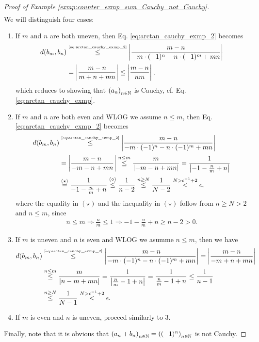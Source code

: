 \begin{proof}[Proof of Example \ref{exmp:counter_exmp_sum_Cauchy_not_Cauchy}]
\begin{align}
	\end{align}
	We will distinguish four cases:
	\begin{enumerate}
		\item If $m$ and $n$ are both uneven, then Eq. \eqref{eq:arctan_cauchy_exmp_2} becomes 
		\begin{align*}
			d(b_m, b_n) &\overset{\tiny\eqref{eq:arctan_cauchy_exmp_2}}{\leq} \abs{\frac{m - n}{- m \cdot (-1)^n -n\cdot (-1)^m + mn}}
			\\[2pt] &= \abs{\frac{m - n}{m + n + mn}} \leq \abs{\frac{m - n}{nm}},
		\end{align*}
		which reduces to showing that $\seq[a_n]$ is Cauchy, cf. Eq. \eqref{eq:arctan_cauchy_exmp}.
		
		\item If $m$ and $n$ are both even and WLOG we assume $n\leq m$, then Eq. \eqref{eq:arctan_cauchy_exmp_2} becomes
		\begin{align*}
			d(b_m, b_n) &\overset{\tiny\eqref{eq:arctan_cauchy_exmp_2}}{\leq} \abs{\frac{m - n}{- m \cdot (-1)^n -n\cdot (-1)^m + mn}}
			\\[2pt] &= \abs{\frac{m - n}{-m-n+mn}} \overset{n\leq m}{\leq} \frac{m}{\abs{-m -n + mn}} = \frac{1}{\abs{-1 -\frac{n}{m} + n}}
			\\[2pt] &\overset{(\star)}{=} \frac{1}{-1-\frac{n}{m} + n} \overset{(\diamond)}{\leq}\frac{1}{n - 2} \overset{n\geq N}{\leq} \frac{1}{N - 2} \overset{N > \epsilon^{-1} + 2}{<} \epsilon,
		\end{align*} 
		where the equality in $(\star)$ and the inequality in $(\star)$ follow from $n\geq N > 2$ and $n\leq m$, since 
		\begin{align*}
			n \leq m \Rightarrow \frac{n}{m} \leq 1\Rightarrow -1- \frac{n}{m} + n\geq n - 2 > 0.
		\end{align*}
		
		\item If $m$ is uneven and $n$ is even and WLOG we asumme $n\leq m$, then we have
		\begin{align*}
			d(b_m, b_n) &\overset{\tiny\eqref{eq:arctan_cauchy_exmp_2}}{\leq} \abs{\frac{m - n}{- m \cdot (-1)^n -n\cdot (-1)^m + mn}} = \abs{\frac{m - n}{-m + n + mn}}
			\\[2pt] &\overset{n\leq m}{\leq} \frac{m}{\abs{n - m + mn}} = \frac{1}{\abs{\frac{n}{m} - 1 + n}} = \frac{1}{\frac{n}{m} - 1 + n} \leq \frac{1}{n - 1}
			\\[2pt] &\overset{n \geq N}{\leq} \frac{1}{N - 1} \overset{N > \epsilon^{-1} + 2}{<} \epsilon.
		\end{align*}
		
		\item If $m$ is even and $n$ is uneven, proceed similarly to 3.
	\end{enumerate}
	Finally, note that it is obvious that $\seq[a_n + b_n] = \seq[(-1)^n]$ is not Cauchy.
\end{proof}

